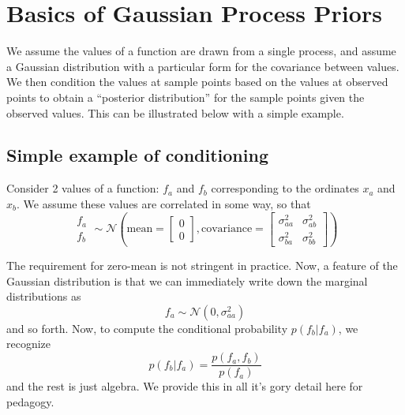 \documentclass{article}
\begin{document}
\section*{Basics of Gaussian Process Priors}

We assume the values of a function are drawn from a single process, and assume a Gaussian distribution with a particular form for the covariance between values. 
We then condition the values at sample points based on the values at observed points to obtain a ``posterior distribution'' for the sample points given the observed values.
This can be illustrated below with a simple example.

\subsection*{Simple example of conditioning}

Consider 2 values of a function: $f_a$ and $f_b$ corresponding to the ordinates $x_a$ and $x_b$.
We assume these values are correlated in some way, so that
\begin{equation}
\begin{matrix}
f_a \\ 
f_b
\end{matrix}
\sim
\mathcal{N} \left(
\mathrm{mean}=
\begin{bmatrix}
0 \\
0
\end{bmatrix}
,
\mathrm{covariance}=
\begin{bmatrix}
\sigma_{aa}^2 & \sigma^2_{ab} \\
\sigma_{ba}^2 & \sigma^2_{bb}
\end{bmatrix}
\right)
\end{equation}

The requirement for zero-mean is not stringent in practice. 
Now, a feature of the Gaussian distribution is that we can immediately write down the marginal distributions as
\begin{equation}
f_a \sim \mathcal{N}\left(0, \sigma_{aa}^2\right)
\end{equation}
and so forth. 
Now, to compute the conditional probability $p(f_b|f_a)$, we recognize
\begin{equation}
p(f_b|f_a) = \frac{p(f_a, f_b)}{p(f_a)}
\end{equation}
and the rest is just algebra.
We provide this in all it's gory detail here for pedagogy.
\end{document}
